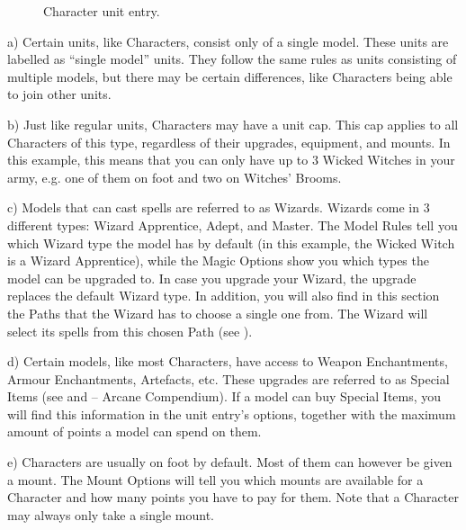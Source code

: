 \newcommand{\wickedwitch}{Wicked Witch}
\newcommand{\hydrophobe}{Hydrophobe}
\newcommand{\hydrophobedef}{%
If the model touches a Water Terrain Feature, it is immediately removed as a casualty.%
}
\newcommand{\redrubberboots}{Red Rubber Boots}
\newcommand{\redrubberbootsdef}{%
The model loses the \hydrophobe{} Model Rule and gains \strider{} (Water Terrain).%
}
\newcommand{\witchesbroom}{Witches' Broom}
\newcommand{\wingedmonkeychariot}{Winged Monkey Chariot}

\begin{figure}[H]
	\centering
	
	\caption{Character unit entry.}
	\label{figure/complex_unit_entry}
\end{figure}

a) Certain units, like Characters, consist only of a single model. These units are labelled as \enquote{single model} units. They follow the same rules as units consisting of multiple models, but there may be certain differences, like Characters being able to join other units.

b) Just like regular units, Characters may have a unit cap. This cap applies to all Characters of this type, regardless of their upgrades, equipment, and mounts. In this example, this means that you can only have up to 3 Wicked Witches in your army, e.g. one of them on foot and two on Witches' Brooms.

c) Models that can cast spells are referred to as Wizards. Wizards come in 3 different types: Wizard Apprentice, Adept, and Master. The Model Rules tell you which Wizard type the model has by default (in this example, the Wicked Witch is a Wizard Apprentice), while the Magic Options show you which types the model can be upgraded to. In case you upgrade your Wizard, the upgrade replaces the default Wizard type. In addition, you will also find in this section the Paths that the Wizard has to choose a single one from. The Wizard will select its spells from this chosen Path (see ).

d) Certain models, like most Characters, have access to Weapon Enchantments, Armour Enchantments, Artefacts, etc. These upgrades are referred to as Special Items (see  and \nameofthegame{} -- Arcane Compendium). If a model can buy Special Items, you will find this information in the unit entry's options, together with the maximum amount of points a model can spend on them.

e) Characters are usually on foot by default. Most of them can however be given a mount. The Mount Options will tell you which mounts are available for a Character and how many points you have to pay for them. Note that a Character may always only take a single mount.

